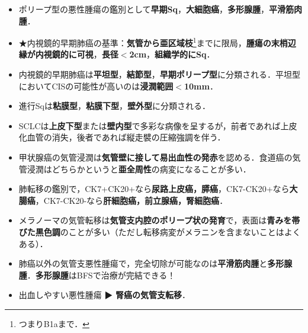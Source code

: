 \begin{itemize}

\item ポリープ型の悪性腫瘍の鑑別として\textbf{早期Sq}，\textbf{大細胞癌}，\textbf{多形腺腫}，\textbf{平滑筋肉腫}．

\item ★内視鏡的早期肺癌の基準：\textbf{気管から亜区域枝}\footnote{つまりB1aまで．}までに限局，\textbf{腫瘍の末梢辺縁が内視鏡的に可視}，\textbf{長径$<$2cm}，\textbf{組織学的にSq}．
\item 内視鏡的早期肺癌は\textbf{平坦型}，\textbf{結節型}，\textbf{早期ポリープ型}に分類される．平坦型においてCISの可能性が高いのは\textbf{浸潤範囲$<$10mm}．
\item 進行Sqは\textbf{粘膜型}，\textbf{粘膜下型}，\textbf{壁外型}に分類される．
\item SCLCは\textbf{上皮下型}または\textbf{壁内型}で多彩な病像を呈するが，前者であれば上皮化血管の消失，後者であれば縦走襞の圧縮強調を伴う．


\item 甲状腺癌の気管浸潤は\textbf{気管壁に接して易出血性の発赤}を認める．食道癌の気管浸潤はどちらかというと\textbf{亜全周性}の病変になることが多い．

\item 肺転移の鑑別で，CK7+CK20+なら\textbf{尿路上皮癌，膵癌}，CK7-CK20+なら\textbf{大腸癌}，CK7-CK20-なら\textbf{肝細胞癌，前立腺癌，腎細胞癌}．
\item メラノーマの気管転移は\textbf{気管支内腔のポリープ状の発育}で，表面は\textbf{青みを帯びた黒色調}のことが多い（ただし転移病変がメラニンを含まないことはよくある）．

\item 肺癌以外の気管支悪性腫瘍で，完全切除が可能なのは\textbf{平滑筋肉腫}と\textbf{多形腺腫}．\textbf{多形腺腫}はBFSで治療が完結できる！
\item 出血しやすい悪性腫瘍 ▶ \textbf{腎癌の気管支転移}．
\end{itemize}




